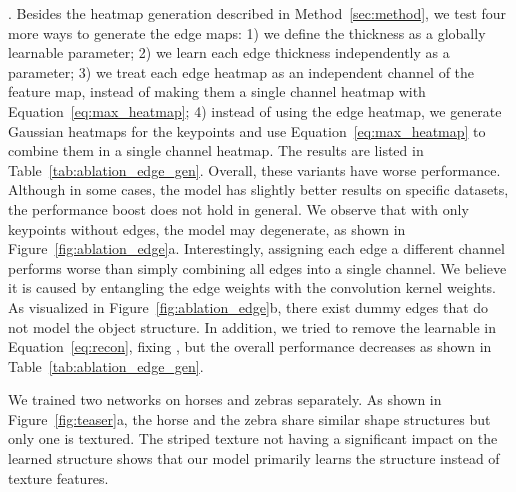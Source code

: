 \documentclass{article}
\begin{document}
. 
Besides the heatmap generation described in Method~\ref{sec:method}, we test four more ways to generate the edge maps: 1) we define the thickness as a globally learnable parameter; 2) we learn each edge thickness independently as a parameter; 3) we treat each edge heatmap as an independent channel of the feature map, instead of making them a single channel heatmap with Equation~\ref{eq:max_heatmap}; 4) instead of using the edge heatmap, we generate Gaussian heatmaps for the keypoints and use Equation~\ref{eq:max_heatmap} to combine them in a single channel heatmap. The results are listed in Table~\ref{tab:ablation_edge_gen}. Overall, these variants have worse performance. Although in some cases, the model has slightly better results on specific datasets, the performance boost does not hold in general. We observe that with only keypoints without edges, the model may degenerate, as shown in Figure~\ref{fig:ablation_edge}a. Interestingly, assigning each edge a different channel performs worse than simply combining all edges into a single channel. We believe it is caused by entangling the edge weights with the convolution kernel weights. As visualized in Figure~\ref{fig:ablation_edge}b, there exist dummy edges that do not model the object structure.
In addition, we tried to remove the learnable  in Equation~\ref{eq:recon}, fixing , but the overall performance decreases as shown in Table~\ref{tab:ablation_edge_gen}.



We trained two networks on horses and zebras separately. As shown in Figure~\ref{fig:teaser}a, the horse and the zebra share similar shape structures but only one is textured. The striped texture not having a significant impact on the learned structure shows that our model primarily learns the structure instead of texture features.
\end{document}
